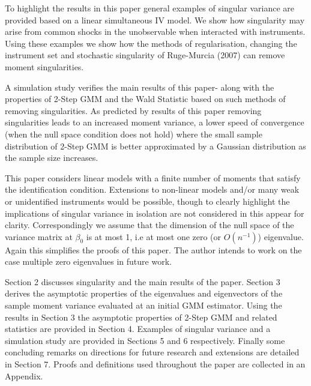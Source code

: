 \documentclass[11pt, fleqn]{article}
\begin{document}
To highlight the results in this paper general examples of singular variance are provided based on a linear simultaneous IV model. We show how singularity may arise from common shocks in the unobservable when interacted with instruments.  Using these examples we show how the methods of  regularisation, changing the instrument set and stochastic singularity of Ruge-Murcia (2007) can remove moment singularities.

A simulation study verifies the main results of this paper- along with the properties of 2-Step GMM and the Wald Statistic based on such methods of removing singularities. As predicted by results of this paper removing singularities leads to an increased moment variance, a  lower speed of convergence (when the null space condition does not hold) where the small sample distribution  of 2-Step GMM is better approximated by a Gaussian distribution as the sample size increases.


This paper considers linear models with a finite number of moments that satisfy the identification condition. Extensions to non-linear models and/or many weak or unidentified instruments would be possible, though to clearly highlight the implications  of singular variance in isolation are not considered in this appear for clarity. Correspondingly we assume that the dimension of the null space of the variance matrix at $\beta_0$ is at most 1, i.e at most one zero (or $O(n^{-1})$) eigenvalue. Again this simplifies the proofs of this paper. The author intends to work on the case multiple zero eigenvalues in future work.


Section 2 discusses singularity and the main results of the paper. Section 3 derives the asymptotic properties of the eigenvalues and eigenvectors of the sample moment variance evaluated at an initial GMM estimator. Using the results in Section 3 the asymptotic properties of 2-Step GMM and related statistics are provided in  Section 4. Examples of singular variance and a simulation study are provided in Sections 5 and 6 respectively. Finally some concluding remarks on directions for future research and extensions are detailed in Section 7. Proofs and definitions used throughout the paper are collected in an Appendix.
\end{document}
